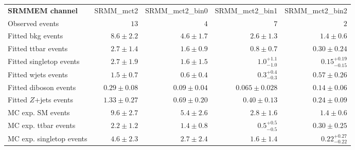 

\begin{table}
\begin{center}
\setlength{\tabcolsep}{0.0pc}
{\small
\begin{tabular*}{\textwidth}{@{\extracolsep{\fill}}lrrrr}
\noalign{\smallskip}\hline\noalign{\smallskip}
{\textbf{ SRMMEM channel}}           & SRMM\_mct2            & SRMM\_mct2\_bin0            & SRMM\_mct2\_bin1            & SRMM\_mct2\_bin2              \\[-0.05cm]
\noalign{\smallskip}\hline\noalign{\smallskip}
Observed events          & $13$              & $4$              & $7$              & $2$                    \\
\noalign{\smallskip}\hline\noalign{\smallskip}
Fitted bkg events         & $8.6 \pm 2.2$          & $4.6 \pm 1.7$          & $2.6 \pm 1.3$          & $1.4 \pm 0.6$              \\
\noalign{\smallskip}\hline\noalign{\smallskip}
        Fitted ttbar events         & $2.7 \pm 1.4$          & $1.6 \pm 0.9$          & $0.8 \pm 0.7$          & $0.30 \pm 0.24$              \\
        Fitted singletop events         & $2.7 \pm 1.9$          & $1.6 \pm 1.5$          & $1.0_{-1.0}^{+1.1}$          & $0.15_{-0.15}^{+0.19}$              \\
        Fitted wjets events         & $1.5 \pm 0.7$          & $0.6 \pm 0.4$          & $0.3_{-0.3}^{+0.4}$          & $0.57 \pm 0.26$              \\
        Fitted diboson events         & $0.29 \pm 0.08$          & $0.09 \pm 0.04$          & $0.065 \pm 0.028$          & $0.14 \pm 0.06$              \\
        Fitted $Z$+jets events         & $1.33 \pm 0.27$          & $0.69 \pm 0.20$          & $0.40 \pm 0.13$          & $0.24 \pm 0.09$              \\
 \noalign{\smallskip}\hline\noalign{\smallskip}
MC exp. SM events              & $9.6 \pm 2.7$          & $5.4 \pm 2.6$          & $2.8 \pm 1.6$          & $1.4 \pm 0.6$              \\
\noalign{\smallskip}\hline\noalign{\smallskip}
        MC exp. ttbar events         & $2.2 \pm 1.2$          & $1.4 \pm 0.8$          & $0.5_{-0.5}^{+0.5}$          & $0.30 \pm 0.25$              \\
        MC exp. singletop events         & $4.6 \pm 2.3$          & $2.7 \pm 2.4$          & $1.6 \pm 1.4$          & $0.22_{-0.22}^{+0.27}$              \\

\end{tabular*}}
\end{center}
\end{table}
